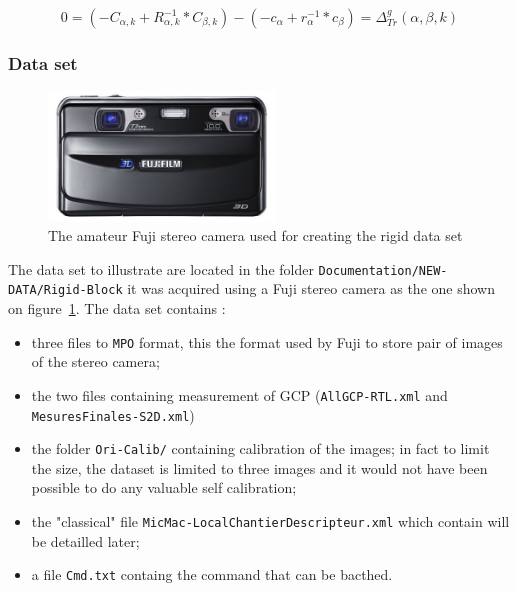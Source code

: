 \begin{equation}
     0 = (- C_{\alpha,k}  + R_{\alpha,k}^{-1} * C_{\beta,k}) -(- c_{\alpha}  + r_{\alpha}^{-1} * c_{\beta})
      = \Delta^g_{Tr}(\alpha,\beta,k)
     \label{EQ:RIG5}
\end{equation}


\subsubsection{Data set}

\begin{figure}
\begin{center}
   \includegraphics[width=60mm]{NEW-DATA/Rigid-Block/Fuji.jpg}
\end{center}
\caption{The amateur Fuji stereo camera used for  creating the rigid data set}
\label{ImFuji}
\end{figure}

The data set to illustrate are located in the folder {\tt Documentation/NEW-DATA/Rigid-Block} it was acquired using
a Fuji stereo camera as the one shown on figure~\ref{ImFuji}. The data set contains :

\begin{itemize}
    \item three files to {\tt MPO}  format, this the format used by Fuji to store pair of images of the stereo camera;
    \item the two files containing measurement of GCP ({\tt AllGCP-RTL.xml} and {\tt MesuresFinales-S2D.xml})
    \item the folder {\tt Ori-Calib/} containing calibration of the images; in fact to limit the size, the dataset
          is limited to three images and it would not have been possible to do any valuable self calibration;

    \item the "classical" file {\tt MicMac-LocalChantierDescripteur.xml} which contain will be detailled later;
    \item a file {\tt Cmd.txt} containg the command that can be bacthed.
\end{itemize}


